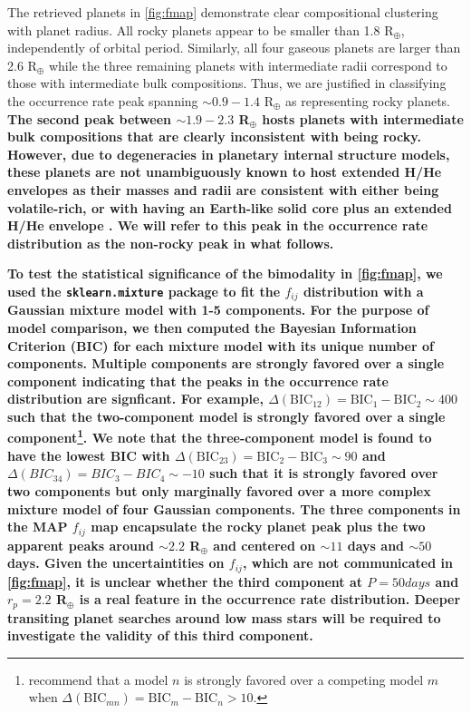 \documentclass[twocolumn]{emulateapj}
\begin{document}
The retrieved planets in \autoref{fig:fmap} demonstrate clear compositional clustering with planet radius.
All rocky planets appear to be smaller than 1.8 R$_{\oplus}$, independently of orbital period.
Similarly, all four gaseous planets are larger than 2.6 R$_{\oplus}$ while the three remaining planets
with intermediate radii correspond to those with intermediate bulk compositions. 
Thus, we are justified in classifying the occurrence rate peak spanning $\sim 0.9-1.4$ R$_{\oplus}$
as representing rocky planets. \textbf{The second peak between $\sim 1.9-2.3$ R$_{\oplus}$ hosts
planets with intermediate bulk compositions that are clearly inconsistent with being rocky. However, due to
degeneracies in planetary internal structure models, these planets are not unambiguously known
to host extended H/He envelopes as their masses and radii 
are consistent with either being volatile-rich, or with having an Earth-like solid core plus an extended
H/He envelope \citep{valencia13}. We will refer to this peak in the occurrence rate distribution
as the non-rocky peak in what follows.}

\textbf{To test the statistical significance of the bimodality in \autoref{fig:fmap}, we used
  the \texttt{sklearn.mixture} package to fit the $f_{ij}$ distribution with a Gaussian mixture model with
  1-5 components. For the purpose of model comparison, we then computed the Bayesian Information
  Criterion (BIC) for each mixture model with its unique number of components.
  Multiple components are strongly favored over a single component indicating that the peaks in the
  occurrence rate distribution are signficant. For example,
  $\Delta(\text{BIC}_{12})=\text{BIC}_1-\text{BIC}_2\sim 400$
  such that the two-component model is strongly favored over a single component\footnote{\cite{kass95}
    recommend that a model $n$ is strongly favored over a competing model $m$
    when $\Delta(\text{BIC}_{mn})=\text{BIC}_m-\text{BIC}_n > 10$.}. We note that the three-component model
  is found to have the lowest BIC with $\Delta(\text{BIC}_{23})=\text{BIC}_2-\text{BIC}_3\sim 90$ and
  $\Delta(BIC_{34})=BIC_3-BIC_4\sim -10$ such that it is strongly favored over two components but only
  marginally favored over a more complex mixture model of four Gaussian components. The three components
  in the MAP $f_{ij}$ map encapsulate the rocky planet peak plus the two apparent peaks around $\sim 2.2$
  R$_{\oplus}$ and centered on $\sim 11$ days and $\sim 50$ days. Given the uncertaintities on $f_{ij}$,
  which are not communicated in \autoref{fig:fmap}, it is unclear whether the third component
  at $P=50 days$ and $r_p=2.2$ R$_{\oplus}$ is a real feature in the occurrence rate distribution. Deeper
  transiting planet searches around low mass stars will be required to investigate the validity of this
  third component.} 
\end{document}
